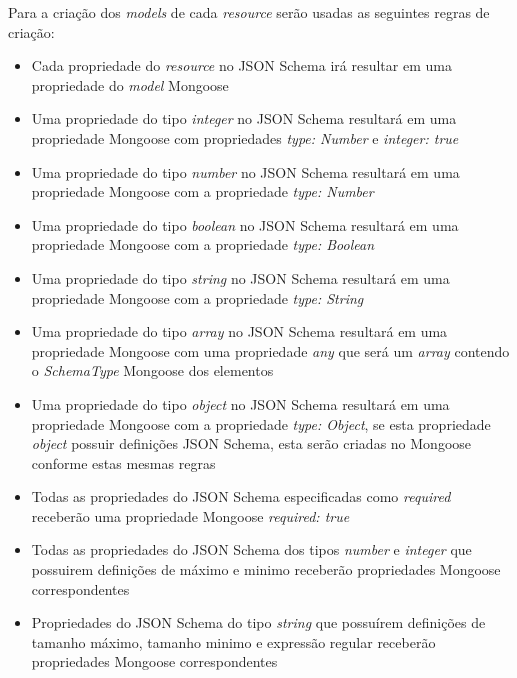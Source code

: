 \label{sec:bnf:mongo}

Para a criação dos \textit{models} de cada \textit{resource} serão usadas as seguintes regras de criação:
\begin{itemize}
    \item Cada propriedade do \textit{resource} no JSON Schema irá resultar em uma propriedade do \textit{model} Mongoose

    \item Uma propriedade do tipo \textit{integer} no JSON Schema resultará em uma propriedade Mongoose com propriedades \textit{type: Number} e \textit{integer: true}
    
    \item Uma propriedade do tipo \textit{number} no JSON Schema resultará em uma propriedade Mongoose com a propriedade \textit{type: Number}
        
    \item Uma propriedade do tipo \textit{boolean} no JSON Schema resultará em uma propriedade Mongoose com a propriedade \textit{type: Boolean}
    
    \item Uma propriedade do tipo \textit{string} no JSON Schema resultará em uma propriedade Mongoose com a propriedade \textit{type: String}
    
    \item Uma propriedade do tipo \textit{array} no JSON Schema resultará em uma propriedade Mongoose com uma propriedade \textit{any} que será um \textit{array} contendo o \textit{SchemaType} Mongoose dos elementos
    
    \item Uma propriedade do tipo \textit{object} no JSON Schema resultará em uma propriedade Mongoose com a propriedade \textit{type: Object}, se esta propriedade \textit{object} possuir definições JSON Schema, esta serão criadas no Mongoose conforme estas mesmas regras
    
    \item Todas as propriedades do JSON Schema especificadas como \textit{required} receberão uma propriedade Mongoose \textit{required: true}
    
    \item Todas as propriedades do JSON Schema dos tipos \textit{number} e \textit{integer} que possuirem definições de máximo e minimo receberão propriedades Mongoose correspondentes
    
    \item Propriedades do JSON Schema do tipo \textit{string} que possuírem definições de tamanho máximo, tamanho minimo e expressão regular receberão propriedades Mongoose correspondentes
    
\end{itemize}

